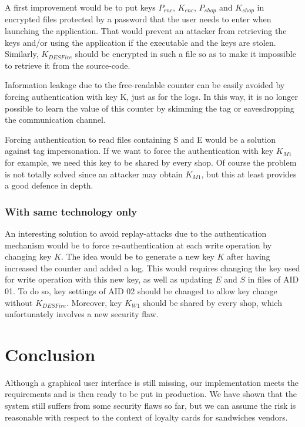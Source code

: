 \documentclass[a4paper,11pt,oneside]{article}
\begin{document}
A first improvement would be to put keys $P_{enc}$, $K_{enc}$, $P_{shop}$ and
$K_{shop}$ in encrypted files protected by a password that the user needs to
enter when launching the application. That would prevent an attacker from
retrieving the keys and/or using the application if the executable and the keys
are stolen. Similarly, $K_{DESFire}$ should be encrypted in such a file so as to
make it impossible to retrieve it from the source-code. 

Information leakage due to the free-readable counter can be easily avoided by
forcing authentication with key K, just as for the logs. In this way, it is no
longer possible to learn the value of this counter by skimming the tag or
eavesdropping the communication channel. 

Forcing authentication to read files containing S and E would be a solution
against tag impersonation. If we want to force the authentication with key
$K_{M1}$ for example, we need this key to be shared by every shop. Of course the
problem is not totally solved since an attacker may obtain $K_{M1}$, but this at
least provides a good defence in depth. 


\subsubsection{With same technology only}

An interesting solution to avoid replay-attacks due to the authentication
mechanism would be to force re-authentication at each write operation by
changing key $K$. The idea would be to generate a new key $K$ after having increased
the counter and added a log. This would requires changing the key used for write
operation with this new key, as well as updating $E$ and $S$ in files of AID 01. To
do so, key settings of AID 02 should be changed to allow key change without
$K_{DESFire}$. Moreover, key $K_{W1}$ should be shared by every shop, which
unfortunately involves a new security flaw. 

\section{Conclusion}

Although a graphical user interface is still missing, our implementation meets
the requirements and is then ready to be put in production. We have shown that
the system  still suffers from some security flaws so far, but we can assume the
risk is reasonable with respect to the context of loyalty cards for sandwiches
vendors. 
\end{document}
